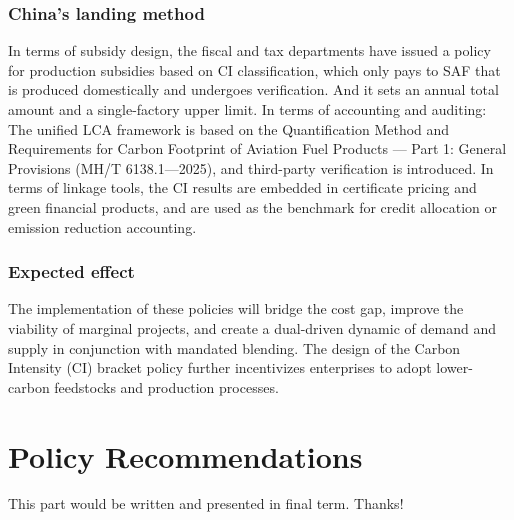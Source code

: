 \documentclass[a4paper,11pt]{article}
\begin{document}
\subsubsection{China's landing method}
In terms of subsidy design, the fiscal and tax departments have issued a policy for production subsidies based on CI classification, which only pays to SAF that is produced domestically and undergoes verification. And it sets an annual total amount and a single-factory upper limit. In terms of accounting and auditing: The unified LCA framework is based on the Quantification Method and Requirements for Carbon Footprint of Aviation Fuel Products --- Part 1: General Provisions (MH/T 6138.1---2025), and third-party verification is introduced. In terms of linkage tools, the CI results are embedded in certificate pricing and green financial products, and are used as the benchmark for credit allocation or emission reduction accounting.

\subsubsection{Expected effect}
The implementation of these policies will bridge the cost gap, improve the viability of marginal projects, and create a dual-driven dynamic of demand and supply in conjunction with mandated blending. The design of the Carbon Intensity (CI) bracket policy further incentivizes enterprises to adopt lower-carbon feedstocks and production processes.



\section{Policy Recommendations}
This part would be written and presented in final term. Thanks!
\end{document}
